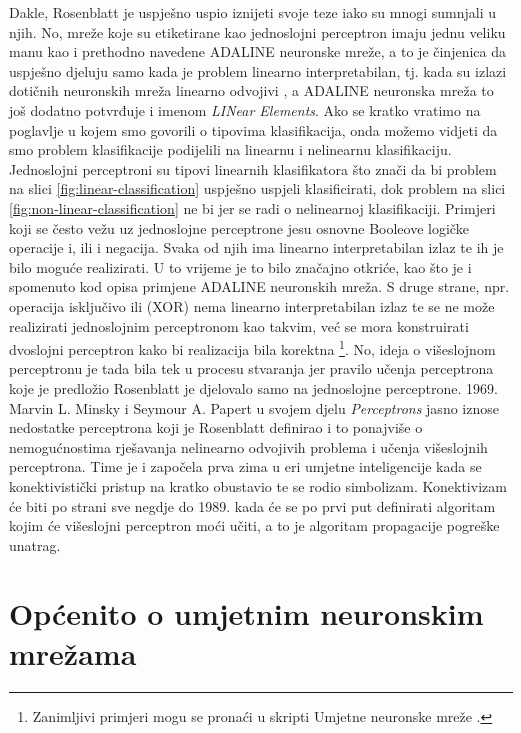 \documentclass[times, utf8, zavrsni]{fer}
\begin{document}
\bigskip

Dakle, Rosenblatt je uspješno uspio iznijeti svoje teze iako su mnogi sumnjali u njih. No, mreže koje su etiketirane kao jednoslojni perceptron imaju jednu veliku manu kao i prethodno navedene ADALINE neuronske mreže, a to je činjenica da uspješno djeluju samo kada je problem linearno interpretabilan, tj. kada su izlazi dotičnih neuronskih mreža linearno odvojivi , a ADALINE neuronska mreža to još dodatno potvrđuje i imenom \textit{LINear Elements}. Ako se kratko vratimo na poglavlje u kojem smo govorili o tipovima klasifikacija, onda možemo vidjeti da smo problem klasifikacije podijelili na linearnu i nelinearnu klasifikaciju. Jednoslojni perceptroni su tipovi linearnih klasifikatora što znači da bi problem na slici \ref{fig:linear-classification} uspješno uspjeli klasificirati, dok problem na slici \ref{fig:non-linear-classification} ne bi jer se radi o nelinearnoj klasifikaciji. Primjeri koji se često vežu uz jednoslojne perceptrone jesu osnovne Booleove logičke operacije i, ili i negacija. Svaka od njih ima linearno interpretabilan izlaz te ih je bilo moguće realizirati. U to vrijeme je to bilo značajno otkriće, kao što je i spomenuto kod opisa primjene ADALINE neuronskih mreža. S druge strane, npr. operacija isključivo ili (XOR) nema linearno interpretabilan izlaz te se ne može realizirati jednoslojnim perceptronom kao takvim, već se mora konstruirati dvoslojni perceptron kako bi realizacija bila korektna \footnote{Zanimljivi primjeri mogu se pronaći u skripti Umjetne neuronske mreže \citep{cupicANN}.}. No, ideja o višeslojnom perceptronu je tada bila tek u procesu stvaranja jer pravilo učenja perceptrona koje je predložio Rosenblatt je djelovalo samo na jednoslojne perceptrone. 1969. Marvin L. Minsky i Seymour A. Papert u svojem djelu \textit{Perceptrons} jasno iznose nedostatke perceptrona koji je Rosenblatt definirao i to ponajviše o nemogućnostima rješavanja nelinearno odvojivih problema i učenja višeslojnih perceptrona. Time je i započela prva zima u eri umjetne inteligencije  kada se konektivistički pristup na kratko obustavio te se rodio simbolizam. Konektivizam će biti po strani sve negdje do 1989. kada će se po prvi put definirati algoritam kojim će višeslojni perceptron moći učiti, a to je algoritam propagacije pogreške unatrag.


\section{Općenito o umjetnim neuronskim mrežama}
\end{document}
